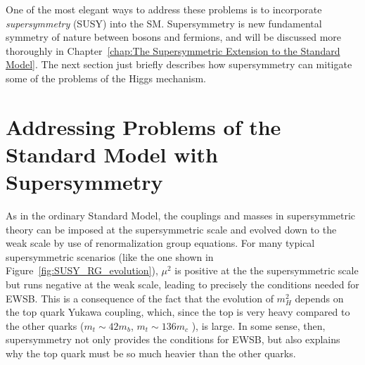 \documentclass[dissertation.tex]{subfiles}
\begin{document}
One of the most elegant ways to address these problems is to incorporate \textit{supersymmetry} (SUSY) into the SM.  Supersymmetry is new fundamental symmetry of nature between bosons and fermions, and will be discussed more thoroughly in Chapter~\ref{chap:The Supersymmetric Extension to the Standard Model}.  The next section just briefly describes how supersymmetry can mitigate some of the problems of the Higgs mechanism.

\section{Addressing Problems of the Standard Model with Supersymmetry}
\label{sec:Addressing Problems of the Standard Model with Supersymmetry}

As in the ordinary Standard Model, the couplings and masses in supersymmetric theory can be imposed at the supersymmetric scale and evolved down to the weak scale by use of renormalization group equations.  For many typical supersymmetric scenarios (like the one shown in Figure~\ref{fig:SUSY_RG_evolution}), $\mu^{2}$ is positive at the the supersymmetric scale but runs negative at the weak scale, leading to precisely the conditions needed for EWSB.  This is a consequence of the fact that the evolution of $m_{H}^{2}$ depends on the top quark Yukawa coupling, which, since the top is very heavy compared to the other quarks ($m_{t}\sim42m_{b}$, $m_{t}\sim136m_{c}$ \cite{PDG}), is large.  In some sense, then, supersymmetry not only provides the conditions for EWSB, but also explains why the top quark must be so much heavier than the other quarks.
\end{document}
